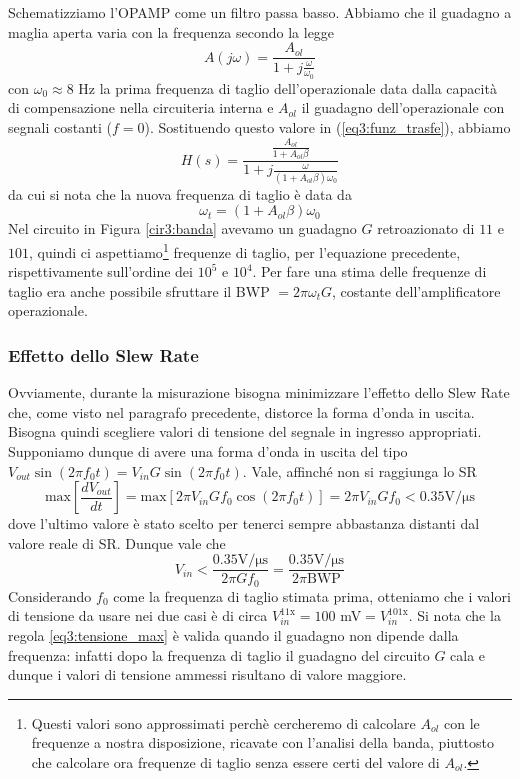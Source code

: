 Schematizziamo l'OPAMP come un filtro passa basso. Abbiamo che il guadagno a maglia aperta varia con la frequenza secondo la legge
$$A(j\omega)=\frac{A_{ol}}{1+j\frac{\omega}{\omega_0}}$$
con $\omega_0 \approx 8$ \si{\hertz} la prima frequenza di taglio dell'operazionale data dalla capacità di compensazione nella circuiteria interna e $A_{ol}$ il guadagno dell'operazionale con segnali costanti ($f = 0$). Sostituendo questo valore in (\ref{eq3:funz_trasfe}), abbiamo
$$H(s)=\frac{\frac{A_{ol}}{1+A_{ol}\beta}}{1+j \frac{\omega}{(1+A_{ol}\beta)\omega_0}}$$
da cui si nota che la nuova frequenza di taglio è data da
\begin{equation}
\omega_t=(1+A_{ol}\beta)\omega_0
\label{eq3:freq_taglio}
\end{equation}
Nel circuito in Figura \ref{cir3:banda} avevamo un guadagno $G$ retroazionato di $11$ e $101$, quindi ci aspettiamo\footnote{Questi valori sono approssimati perchè cercheremo di calcolare $A_{ol}$ con le frequenze a nostra disposizione, ricavate con l'analisi della banda, piuttosto che calcolare ora frequenze di taglio senza essere certi del valore di $A_{ol}$.} frequenze di taglio, per l'equazione precedente, rispettivamente sull'ordine dei $10^5$ e $10^4$. Per fare una stima delle frequenze di taglio era anche possibile sfruttare il BWP $= 2 \pi \omega_t G$, costante dell'amplificatore operazionale.

\subsubsection{Effetto dello Slew Rate}

Ovviamente, durante la misurazione bisogna minimizzare l'effetto dello Slew Rate che, come visto nel paragrafo precedente, distorce la forma d'onda in uscita. Bisogna quindi scegliere valori di tensione del segnale in ingresso appropriati.
Supponiamo dunque di avere una forma d'onda in uscita del tipo $V_{out} \sin (2 \pi f_0 t) = V_{in} G \sin (2 \pi f_0 t)$. Vale, affinché non si raggiunga lo SR
$$\mathrm{max}\left[ \frac{dV_{out}}{dt} \right] = \mathrm{max} \left[ 2 \pi V_{in} G f_0 \cos (2 \pi f_0 t) \right]= 2 \pi V_{in} G f_0 < 0.35 \si{\volt\per\micro\second}$$
dove l'ultimo valore è stato scelto per tenerci sempre abbastanza distanti dal valore reale di SR. Dunque vale che
\begin{equation}
V_{in}<\frac{0.35 \si{\volt\per\micro\second}}{2 \pi G f_0} = \frac{0.35 \si{\volt\per\micro\second}}{2 \pi \mathrm{BWP}}
\label{eq3:tensione_max}
\end{equation}
Considerando $f_0$ come la frequenza di taglio stimata prima, otteniamo che i valori di tensione da usare nei due casi è di circa $V_{in}^{11\mathrm{x}} = 100$ \si{\milli\volt}$= V_{in}^{101\mathrm{x}}$. Si nota che la regola \ref{eq3:tensione_max} è valida quando il guadagno non dipende dalla frequenza: infatti dopo la frequenza di taglio il guadagno del circuito $G$ cala e dunque i valori di tensione ammessi risultano di valore maggiore.


